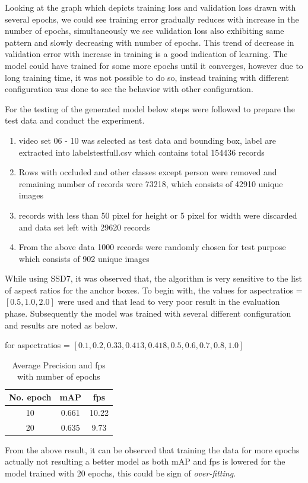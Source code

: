 \newpara
Looking at the graph which depicts training loss and validation loss drawn with several epochs, we could see training error gradually reduces with increase in the number of epochs, simultaneously we see validation loss also exhibiting same pattern and slowly decreasing with number of epochs. This trend of decrease in validation error with increase in training is a good indication of learning. The model could have trained for some more epochs until it converges, however due to long training time, it was not possible to do so, instead training with different configuration was done to see the behavior with other configuration.

For the testing of the generated model below steps were followed to prepare the test data and conduct the experiment.
\begin{enumerate}
	\item video set 06 - 10 was selected as test data and bounding box, label are extracted into labels\textunderscore test\textunderscore full.csv which contains total 154436 records
	\item Rows with occluded and other classes except person were removed and remaining number of records were 73218, which consists of 42910 unique images 
	\item records with less than 50 pixel for height or 5 pixel for width were discarded and data set left with 29620 records
	\item From the above data 1000 records were randomly chosen for test purpose which consists of 902 unique images
\end{enumerate}

\newpara
While using SSD7, it was observed that, the algorithm is very sensitive to the list of aspect ratios for the anchor boxes. To begin with, the values for aspect\textunderscore ratios = $[0.5, 1.0, 2.0]$ were used and that lead to very poor result in the evaluation phase. Subsequently the model was trained with several different configuration and results are noted as below.

for aspect\textunderscore ratios = $[0.1, 0.2, 0.33, 0.413, 0.418, 0.5, 0.6, 0.7, 0.8, 1.0]$
\begin{table}[H]
\begin{center}
 \begin{tabular}{||c c c||} 
 \hline
 No. epoch & mAP & fps\\ [0.8ex] 
 \hline\hline
 10 & 0.661 & 10.22\\ 
 \hline
 20  & 0.635 & 9.73 \\
\hline
\end{tabular}
\caption{Average Precision and fps with number of epochs}
\end{center}
\end{table}
From the above result, it can be observed that training the data for more epochs actually not resulting a better model as both mAP and fps is lowered for the model trained with 20 epochs, this could be sign of \textit{over-fitting.}

